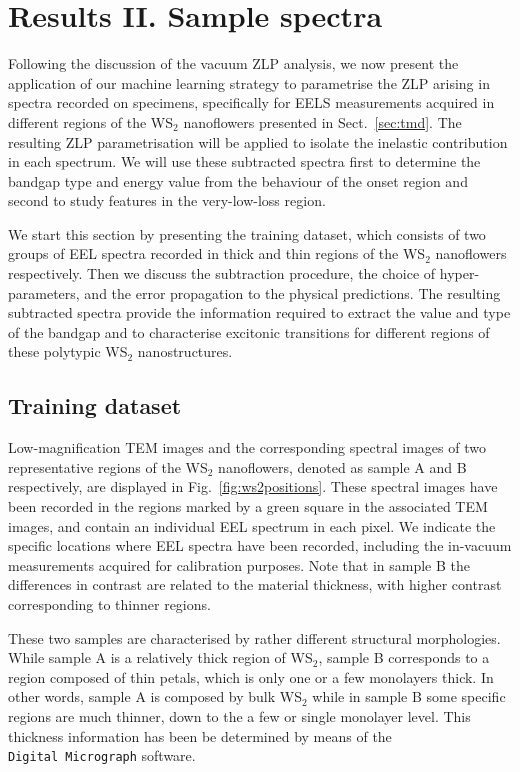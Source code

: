 \section{Results II. Sample spectra}
\label{sec:results_sample}

Following the discussion of the vacuum ZLP analysis, we now
present the application of our machine learning strategy to parametrise the ZLP
arising in spectra recorded on specimens, specifically for
EELS measurements acquired in different regions
of the WS$_2$ nanoflowers presented in Sect.~\ref{sec:tmd}.
%
The resulting ZLP parametrisation will be applied to isolate the inelastic
contribution in each spectrum.
%
We will use these subtracted spectra first to determine the bandgap type and energy 
value from the behaviour of the onset region and second to study features
in the very-low-loss region.

We start this section by presenting the training dataset, which consists of two groups of EEL spectra recorded
in thick and thin regions of the WS$_2$  nanoflowers respectively.
%
Then we discuss the subtraction procedure, the choice of hyper-parameters, and the error propagation
to the physical predictions.
%
The resulting subtracted spectra provide the information
required to extract the value and type of the bandgap
and to characterise excitonic transitions for different regions of these polytypic WS$_2$ nanostructures.


\subsection{Training dataset}
%

Low-magnification TEM images and the corresponding
spectral images of two representative regions of
the WS$_2$ nanoflowers, denoted as sample A and B  respectively, are displayed in Fig.~\ref{fig:ws2positions}.
%
These spectral images have been recorded in the regions marked by a green square
in the associated TEM images, and contain an individual EEL spectrum in each pixel.
%
We indicate the specific locations where
EEL spectra have been recorded, including the in-vacuum measurements acquired
for calibration purposes.
%
Note that in sample B  the differences in contrast are related to the material
thickness, with higher contrast corresponding to thinner regions.

These two samples are characterised by rather different structural morphologies.
%
While sample A is a relatively thick region of WS$_2$, sample B corresponds to a region composed 
of thin petals, which is only one or a few monolayers thick. 
%
In other words, sample A is composed by bulk WS$_2$ while in sample B some specific regions
are much thinner, down to the a few or single monolayer level.
%
This thickness information has been be determined
by means of the {\tt Digital~Micrograph} software.

